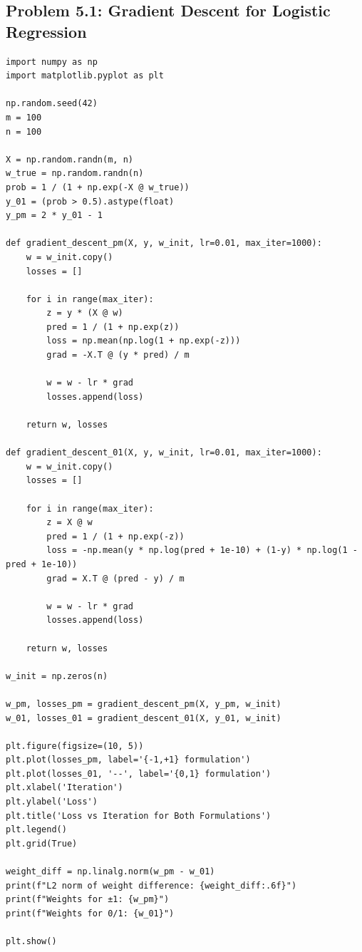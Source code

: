 \documentclass[11pt]{article}
\begin{document}
\subsection{Problem 5.1: Gradient Descent for Logistic Regression}
\begin{verbatim}
import numpy as np
import matplotlib.pyplot as plt

np.random.seed(42)
m = 100
n = 100

X = np.random.randn(m, n) 
w_true = np.random.randn(n)
prob = 1 / (1 + np.exp(-X @ w_true))
y_01 = (prob > 0.5).astype(float)
y_pm = 2 * y_01 - 1

def gradient_descent_pm(X, y, w_init, lr=0.01, max_iter=1000):
    w = w_init.copy()
    losses = []
    
    for i in range(max_iter):
        z = y * (X @ w)
        pred = 1 / (1 + np.exp(z))
        loss = np.mean(np.log(1 + np.exp(-z)))
        grad = -X.T @ (y * pred) / m
            
        w = w - lr * grad
        losses.append(loss)
    
    return w, losses

def gradient_descent_01(X, y, w_init, lr=0.01, max_iter=1000):
    w = w_init.copy()
    losses = []
    
    for i in range(max_iter):
        z = X @ w
        pred = 1 / (1 + np.exp(-z))
        loss = -np.mean(y * np.log(pred + 1e-10) + (1-y) * np.log(1 - pred + 1e-10))
        grad = X.T @ (pred - y) / m
            
        w = w - lr * grad
        losses.append(loss)
    
    return w, losses

w_init = np.zeros(n)

w_pm, losses_pm = gradient_descent_pm(X, y_pm, w_init)
w_01, losses_01 = gradient_descent_01(X, y_01, w_init)

plt.figure(figsize=(10, 5))
plt.plot(losses_pm, label='{-1,+1} formulation')
plt.plot(losses_01, '--', label='{0,1} formulation')
plt.xlabel('Iteration')
plt.ylabel('Loss')
plt.title('Loss vs Iteration for Both Formulations')
plt.legend()
plt.grid(True)

weight_diff = np.linalg.norm(w_pm - w_01)
print(f"L2 norm of weight difference: {weight_diff:.6f}")
print(f"Weights for ±1: {w_pm}")
print(f"Weights for 0/1: {w_01}")

plt.show()
\end{verbatim}
\end{document}
